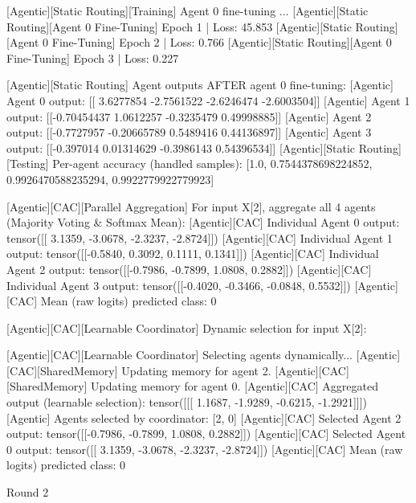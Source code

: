 [Agentic][Static Routing][Training] Agent 0 fine-tuning ...
[Agentic][Static Routing][Agent 0 Fine-Tuning] Epoch 1 | Loss: 45.853
[Agentic][Static Routing][Agent 0 Fine-Tuning] Epoch 2 | Loss: 0.766
[Agentic][Static Routing][Agent 0 Fine-Tuning] Epoch 3 | Loss: 0.227

[Agentic][Static Routing] Agent outputs AFTER agent 0 fine-tuning:
[Agentic] Agent 0 output: [[ 3.6277854 -2.7561522 -2.6246474 -2.6003504]]
[Agentic] Agent 1 output: [[-0.70454437  1.0612257  -0.3235479   0.49998885]]
[Agentic] Agent 2 output: [[-0.7727957  -0.20665789  0.5489416   0.44136897]]
[Agentic] Agent 3 output: [[-0.397014    0.01314629 -0.3986143   0.54396534]]
[Agentic][Static Routing][Testing] Per-agent accuracy (handled samples): [1.0, 0.7544378698224852, 0.9926470588235294, 0.9922779922779923]

[Agentic][CAC][Parallel Aggregation] For input X[2], aggregate all 4 agents (Majority Voting & Softmax Mean):
[Agentic][CAC] Individual Agent 0 output: tensor([[ 3.1359, -3.0678, -2.3237, -2.8724]])
[Agentic][CAC] Individual Agent 1 output: tensor([[-0.5840,  0.3092,  0.1111,  0.1341]])
[Agentic][CAC] Individual Agent 2 output: tensor([[-0.7986, -0.7899,  1.0808,  0.2882]])
[Agentic][CAC] Individual Agent 3 output: tensor([[-0.4020, -0.3466, -0.0848,  0.5532]])
[Agentic][CAC] Mean (raw logits) predicted class: 0

[Agentic][CAC][Learnable Coordinator] Dynamic selection for input X[2]:

[Agentic][CAC][Learnable Coordinator] Selecting agents dynamically...
[Agentic][CAC][SharedMemory] Updating memory for agent 2.
[Agentic][CAC][SharedMemory] Updating memory for agent 0.
[Agentic][CAC] Aggregated output (learnable selection): tensor([[[ 1.1687, -1.9289, -0.6215, -1.2921]]])
[Agentic] Agents selected by coordinator: [2, 0]
[Agentic][CAC] Selected Agent 2 output: tensor([[-0.7986, -0.7899,  1.0808,  0.2882]])
[Agentic][CAC] Selected Agent 0 output: tensor([[ 3.1359, -3.0678, -2.3237, -2.8724]])
[Agentic][CAC] Mean (raw logits) predicted class: 0

Round 2

